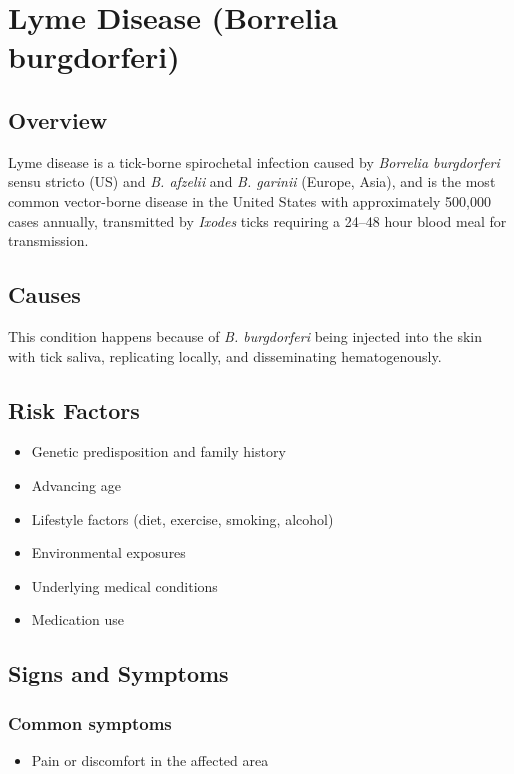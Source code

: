 \chapter{Lyme Disease (Borrelia burgdorferi)}
\label{sec:Lyme Disease}

\section{Overview}
Lyme disease is a tick-borne spirochetal infection caused by \textit{Borrelia burgdorferi} sensu stricto (US) and \textit{B. afzelii} and \textit{B. garinii} (Europe, Asia), and is the most common vector-borne disease in the United States with approximately 500,000 cases annually, transmitted by \textit{Ixodes} ticks requiring a 24--48 hour blood meal for transmission.
\section{Causes}
This condition happens because of \textit{B. burgdorferi} being injected into the skin with tick saliva, replicating locally, and disseminating hematogenously.     
\section{Risk Factors}

\begin{itemize}[noitemsep]
  \item Genetic predisposition and family history
  \item Advancing age
  \item Lifestyle factors (diet, exercise, smoking, alcohol)
  \item Environmental exposures
  \item Underlying medical conditions
  \item Medication use
\end{itemize}
\section{Signs and Symptoms}

\subsection{Common symptoms}
\begin{itemize}[noitemsep]
  \item Pain or discomfort in the affected area
  \end{itemize}

